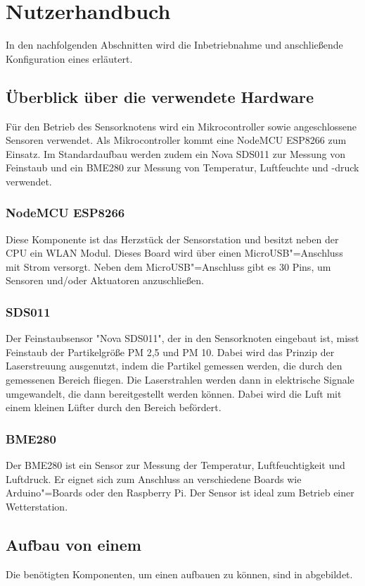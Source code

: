 
\let\levelone\section
\let\leveltwo\subsection
\let\levelthree\subsubsection

\levelone{Nutzerhandbuch \sk}
\label{sec:nutzerhandbuch:sk}
In den nachfolgenden Abschnitten wird die Inbetriebnahme und anschließende Konfiguration eines \sk erläutert.

\leveltwo{Überblick über die verwendete Hardware}
Für den Betrieb des Sensorknotens wird ein Mikrocontroller sowie angeschlossene Sensoren verwendet.
Als Mikrocontroller kommt eine NodeMCU ESP8266 zum Einsatz.
Im Standardaufbau werden zudem ein Nova SDS011 zur Messung von Feinstaub und ein BME280 zur Messung von Temperatur, Luftfeuchte und -druck verwendet.

\levelthree{NodeMCU ESP8266}
Diese Komponente ist das Herzstück der Sensorstation und besitzt neben der CPU ein WLAN Modul.
Dieses Board wird über einen MicroUSB"=Anschluss mit Strom versorgt.
Neben dem MicroUSB"=Anschluss gibt es 30 Pins, um Sensoren und/oder Aktuatoren anzuschließen.

\levelthree{SDS011}
Der Feinstaubsensor "Nova SDS011", der in den Sensorknoten eingebaut ist, misst Feinstaub der Partikelgröße PM 2,5 und PM 10.
Dabei wird das Prinzip der Laserstreuung ausgenutzt, indem die Partikel gemessen werden, die durch den gemessenen Bereich fliegen.
Die Laserstrahlen werden dann in elektrische Signale umgewandelt, die dann bereitgestellt werden können.
Dabei wird die Luft mit einem kleinen Lüfter durch den Bereich befördert.

\levelthree{BME280}
Der BME280 ist ein Sensor zur Messung der Temperatur, Luftfeuchtigkeit und Luftdruck.
Er eignet sich zum Anschluss an verschiedene Boards wie Arduino"=Boards oder den Raspberry Pi.
Der Sensor ist ideal zum Betrieb einer Wetterstation.

\leveltwo{Aufbau von einem \sk}
Die benötigten Komponenten, um einen \sk aufbauen zu können, sind in  abgebildet.

